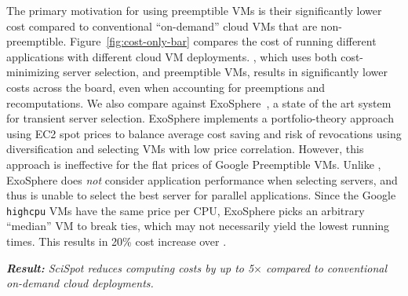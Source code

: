 The primary motivation for using preemptible VMs is their significantly lower cost compared to conventional ``on-demand'' cloud VMs that are non-preemptible. 
Figure~\ref{fig:cost-only-bar} compares the cost of running different applications with different cloud VM deployments. 
\sysname, which uses both cost-minimizing server selection, and preemptible VMs, results in significantly lower costs across the board, even when accounting for preemptions and recomputations. 
%
We also compare against ExoSphere~\cite{exosphere}, a state of the art  system for transient server selection.
ExoSphere implements a portfolio-theory approach using EC2 spot prices to balance average cost saving and risk of revocations using diversification and selecting VMs with low price correlation.
However, this approach is ineffective for the flat prices of Google Preemptible VMs. 
Unlike \sysname, ExoSphere does \emph{not} consider application performance when selecting servers, and thus is unable to select the best server for parallel applications. 
Since the Google \texttt{highcpu} VMs have the same price per CPU, ExoSphere picks an arbitrary ``median'' VM to break ties, which may not necessarily yield the lowest running times.
This results in 20\% cost increase over \sysname. 

\noindent \emph{\textbf{Result:} SciSpot reduces computing costs by up to 5$\times$ compared to conventional on-demand cloud deployments.}


